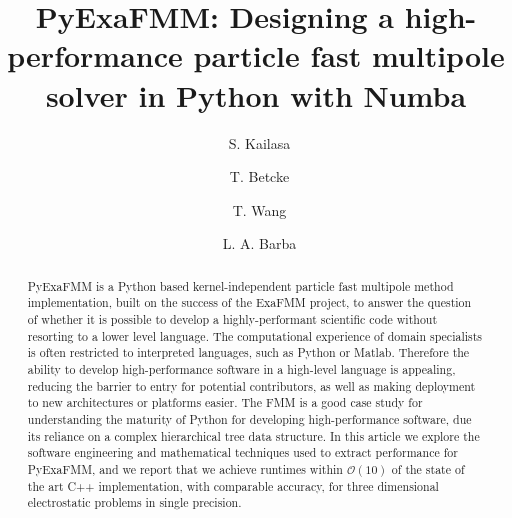 \documentclass{IEEEcsmag}
\begin{document}

\title{PyExaFMM: Designing a high-performance particle fast multipole solver in Python with Numba}

\author{\ S. Kailasa}

\author{\ T. Betcke}

\author{\ T. Wang}

\author{\ L. A. Barba}


\begin{abstract}
PyExaFMM is a Python based kernel-independent particle fast multipole method implementation, built on the success of the ExaFMM project, to answer the question of whether it is possible to develop a highly-performant scientific code without resorting to a lower level language. The computational experience of domain specialists is often restricted to interpreted languages, such as Python or Matlab. Therefore the ability to develop high-performance software in a high-level language is appealing, reducing the barrier to entry for potential contributors, as well as making deployment to new architectures or platforms easier. The FMM is a good case study for understanding the maturity of Python for developing high-performance software, due its reliance on a complex hierarchical tree data structure. In this article we explore the software engineering and mathematical techniques used to extract performance for PyExaFMM, and we report that we achieve runtimes within $\mathcal{O}(10)$ of the state of the art C++ implementation, with comparable accuracy, for three dimensional electrostatic problems in single precision.

\end{abstract}

\maketitle
\end{document}
